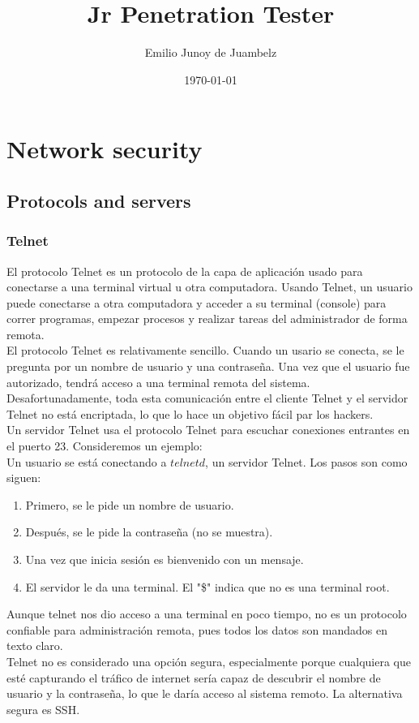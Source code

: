 \documentclass[12pt]{report}
\title{Jr Penetration Tester}
\author{Emilio Junoy de Juambelz}
\date{\today}
\begin{document}
\chapter{Network security}

\section{Protocols and servers}

\subsection{Telnet}
El protocolo Telnet es un protocolo de la capa de aplicación
usado para conectarse a una terminal virtual u otra computadora.
Usando Telnet, un usuario puede conectarse a otra computadora y 
acceder a su terminal (console) para correr programas, empezar
procesos y realizar tareas del administrador de forma remota.\\

El protocolo Telnet es relativamente sencillo. Cuando un usario 
se conecta, se le pregunta por un nombre de usuario y una 
contraseña. Una vez que el usuario fue autorizado, tendrá acceso
a una terminal remota del sistema. Desafortunadamente, toda esta 
comunicación entre el cliente Telnet y el servidor Telnet no
está encriptada, lo que lo hace un objetivo fácil par los hackers.\\

Un servidor Telnet usa el protocolo Telnet para escuchar conexiones
entrantes en el puerto 23. Consideremos un ejemplo:\\
Un usuario se está conectando a $\textit{telnetd}$, un servidor
Telnet. Los pasos son como siguen:
\begin{enumerate}
  \item Primero, se le pide un nombre de usuario.
  \item Después, se le pide la contraseña (no se muestra).
  \item Una vez que inicia sesión es bienvenido con un mensaje.
  \item El servidor le da una terminal. El "\$" indica que no es
    una terminal root.
\end{enumerate}
Aunque telnet nos dio acceso a una terminal en poco tiempo, no
es un protocolo confiable para administración remota, pues todos
los datos son mandados en texto claro.\\
Telnet no es considerado una opción segura, especialmente porque
cualquiera que esté capturando el tráfico de internet sería capaz
de descubrir el nombre de usuario y la contraseña, lo que le daría
acceso al sistema remoto. La alternativa segura es SSH.
\end{document}
